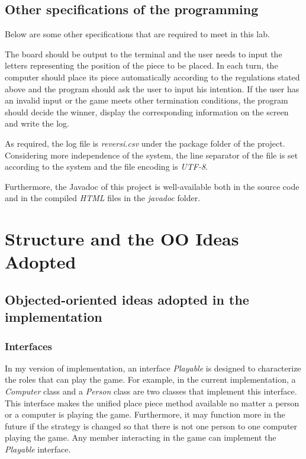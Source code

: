 \documentclass[a4paper]{report}
\begin{document}
\section{Other specifications of the programming}
Below are some other specifications that are required to meet in this lab.
\par
The board should be output to the terminal and the user needs to input the letters representing the position of the piece to be placed. In each turn, the computer should place its piece automatically according to the regulations stated above and the program should ask the user to input his intention. If the user has an invalid input or the game meets other termination conditions, the program should decide the winner, display the corresponding information on the screen and write the log.
\par
As required, the log file is \emph{reversi.csv} under the package folder of the project. Considering more independence of the system, the line separator of the file is set according to the system and the file encoding is \emph{UTF-8}.
\par
Furthermore, the Javadoc of this project is well-available both in the source code and in the compiled \emph{HTML} files in the \emph{javadoc} folder.

\chapter{Structure and  the OO Ideas Adopted}
\section{Objected-oriented ideas adopted in the implementation}
\subsection{Interfaces}
In my version of implementation, an interface \emph{Playable} is designed to characterize the roles that can play the game. For example, in the current implementation, a \emph{Computer} class and a \emph{Person} class are two classes that implement this interface. This interface makes the unified place piece method available no matter a person or a computer is playing the game. Furthermore, it may function more in the future if the strategy is changed so that there is not one person to one computer playing the game. Any member interacting in the game can implement the \emph{Playable} interface.
\end{document}
